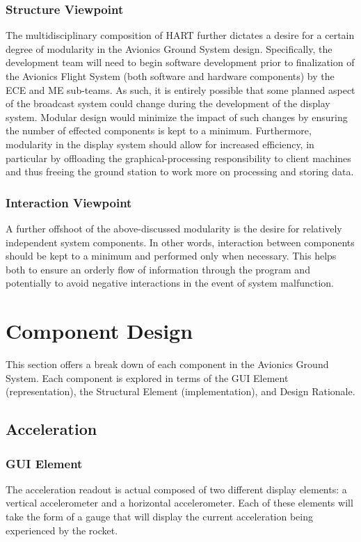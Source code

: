 \documentclass[journal,10pt,onecolumn,compsoc]{IEEEtran}
\begin{document}
		\subsubsection{Structure Viewpoint}
			\noindent The multidisciplinary composition of HART further dictates a desire for a certain degree of modularity in the Avionics Ground System design.
			Specifically, the development team will need to begin software development prior to finalization of the Avionics Flight System (both software and hardware components) by the ECE and ME sub-teams.
			As such, it is entirely possible that some planned aspect of the broadcast system could change during the development of the display system.
			Modular design would minimize the impact of such changes by ensuring the number of effected components is kept to a minimum.
			Furthermore, modularity in the display system should allow for increased efficiency, in particular by offloading the graphical-processing responsibility to client machines and thus freeing the ground station to work more on processing and storing data. 

		\subsubsection{Interaction Viewpoint}
			\noindent A further offshoot of the above-discussed modularity is the desire for relatively independent system components.
			In other words, interaction between components should be kept to a minimum and performed only when necessary.
			This helps both to ensure an orderly flow of information through the program and potentially to avoid negative interactions in the event of system malfunction.
\newpage


\section{Component Design}
	This section offers a break down of each component in the Avionics Ground System.
	Each component is explored in terms of the GUI Element (representation), the Structural Element (implementation), and Design Rationale.

	\subsection{Acceleration}

		\subsubsection{GUI Element}
			The acceleration readout is actual composed of two different display elements: a vertical accelerometer and a horizontal accelerometer.
			Each of these elements will take the form of a gauge that will display the current acceleration being experienced by the rocket.
			
\end{document}
